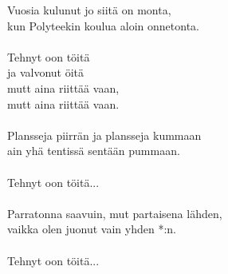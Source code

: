 
            Vuosia kulunut jo siitä on monta, \\
            kun Polyteekin koulua aloin onnetonta. \\
\hspace{10mm} \\
            Tehnyt oon töitä \\
            ja valvonut öitä \\
            mutt aina riittää vaan, \\
            mutt aina riittää vaan. \\
\hspace{10mm} \\
            Plansseja piirrän ja plansseja kummaan \\
            ain yhä tentissä sentään pummaan. \\
\hspace{10mm} \\
            Tehnyt oon töitä... \\
\hspace{10mm} \\
            Parratonna saavuin, mut partaisena lähden, \\
            vaikka olen juonut vain yhden *:n. \\
\hspace{10mm} \\
            Tehnyt oon töitä... \\
